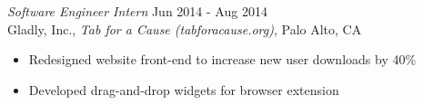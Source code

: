 {\sl Software Engineer Intern} \hfill Jun 2014 - Aug 2014 \\
Gladly, Inc., \textit{Tab for a Cause (tabforacause.org)}, Palo Alto, CA
\begin{itemize} \itemsep -2pt %
\item Redesigned website front-end to increase new user downloads by 40\%
\item Developed drag-and-drop widgets for browser extension
\end{itemize}
